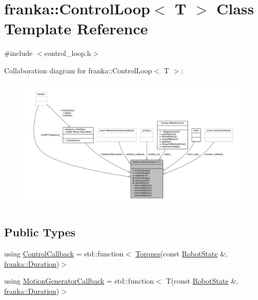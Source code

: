 \hypertarget{classfranka_1_1ControlLoop}{}\section{franka\+:\+:Control\+Loop$<$ T $>$ Class Template Reference}
\label{classfranka_1_1ControlLoop}


{\ttfamily \#include $<$control\+\_\+loop.\+h$>$}



Collaboration diagram for franka\+:\+:Control\+Loop$<$ T $>$\+:
\nopagebreak
\begin{figure}[H]
\begin{center}
\leavevmode
\includegraphics[width=350pt]{classfranka_1_1ControlLoop__coll__graph}
\end{center}
\end{figure}
\subsection*{Public Types}
\begin{DoxyCompactItemize}
\item 
using \hyperlink{classfranka_1_1ControlLoop_a1b050245c6f2795d491899440f95cec3}{Control\+Callback} = std\+::function$<$ \hyperlink{classfranka_1_1Torques}{Torques}(const \hyperlink{structfranka_1_1RobotState}{Robot\+State} \&, \hyperlink{classfranka_1_1Duration}{franka\+::\+Duration})$>$
\item 
using \hyperlink{classfranka_1_1ControlLoop_a23624d5a86fe2b206986af4757ba1822}{Motion\+Generator\+Callback} = std\+::function$<$ T(const \hyperlink{structfranka_1_1RobotState}{Robot\+State} \&, \hyperlink{classfranka_1_1Duration}{franka\+::\+Duration})$>$
\end{DoxyCompactItemize}
